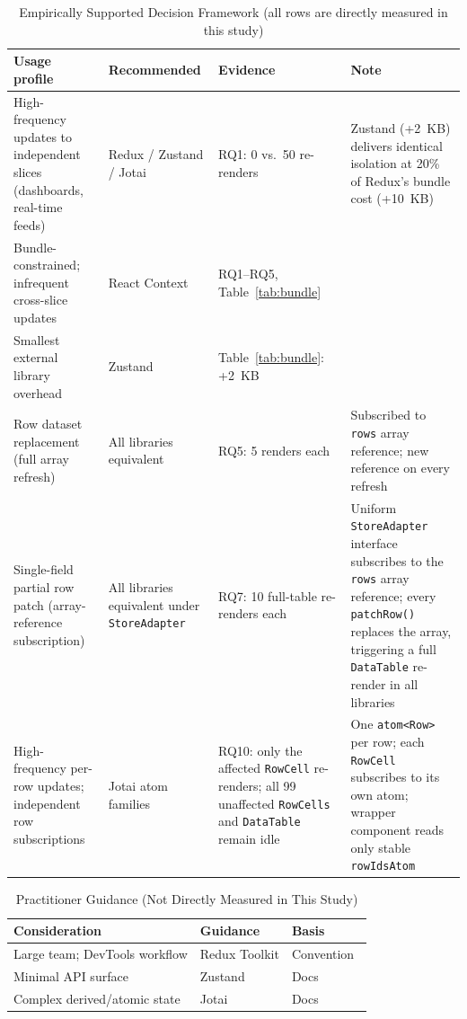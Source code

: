 \documentclass[conference]{IEEEtran}
\newcommand{\code}[1]{\texttt{\small #1}}
\begin{document}
\begin{table}[tb]
\caption{Empirically Supported Decision Framework (all rows are
directly measured in this study)}
\label{tab:framework}
\begin{center}
\small
\setlength{\tabcolsep}{5pt}
\begin{tabular}{p{4.2cm}p{2.8cm}p{2.8cm}p{4.2cm}}
\toprule
\textbf{Usage profile} & \textbf{Recommended} & \textbf{Evidence} & \textbf{Note} \\
\midrule
High-frequency updates to independent slices (dashboards, real-time feeds)
  & Redux / Zustand / Jotai
  & RQ1: 0 vs.\ 50 re-renders
  & Zustand (+2~KB) delivers identical isolation at 20\% of Redux's bundle cost (+10~KB) \\
Bundle-constrained; infrequent cross-slice updates
  & React Context
  & RQ1--RQ5, Table~\ref{tab:bundle}
  & \\
Smallest external library overhead
  & Zustand
  & Table~\ref{tab:bundle}: +2~KB
  & \\
Row dataset replacement (full array refresh)
  & All libraries equivalent
  & RQ5: 5 renders each
  & Subscribed to \code{rows} array reference; new reference on every refresh \\
Single-field partial row patch (array-reference subscription)
  & All libraries equivalent under \code{StoreAdapter}
  & RQ7: 10 full-table re-renders each
  & Uniform \code{StoreAdapter} interface subscribes to the \code{rows}
    array reference; every \code{patchRow()} replaces the array,
    triggering a full \code{DataTable} re-render in all libraries \\
High-frequency per-row updates; independent row subscriptions
  & Jotai atom families
  & RQ10: only the affected \code{RowCell} re-renders; all 99 unaffected
    \code{RowCells} and \code{DataTable} remain idle
  & One \code{atom<Row>} per row; each \code{RowCell} subscribes to its
    own atom; wrapper component reads only stable \code{rowIdsAtom} \\
\bottomrule
\end{tabular}
\end{center}
\end{table}

\begin{table}[tb]
\caption{Practitioner Guidance (Not Directly Measured in This Study)}
\label{tab:practitioner}
\begin{center}
\small
\setlength{\tabcolsep}{4pt}
\begin{tabular}{p{2.4cm}p{2.4cm}p{2.0cm}}
\toprule
\textbf{Consideration} & \textbf{Guidance} & \textbf{Basis} \\
\midrule
Large team; DevTools workflow & Redux Toolkit & Convention~\cite{b7} \\
Minimal API surface            & Zustand        & Docs~\cite{b2} \\
Complex derived/atomic state   & Jotai          & Docs~\cite{b3} \\
\bottomrule
\end{tabular}
\end{center}
\end{table}
\end{document}
